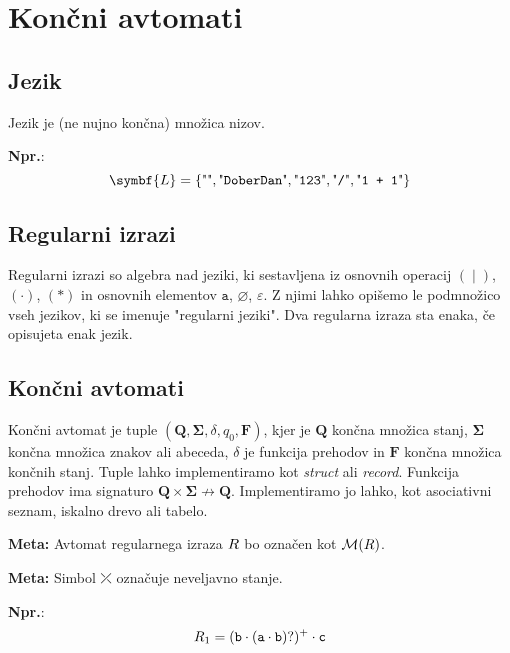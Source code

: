 \documentclass{report}
\newcommand{\Ex}{\textbf{Npr.}:\ }
\newcommand{\Special}[1]{\textbf{#1}}
\newcommand{\Empty}{\varnothing}
\newcommand{\Null}{\varepsilon}
\newcommand{\Automaton}[1]{\mathcal{M}(#1)}
\newcommand{\Str}[1]{\text{\textquotedbl\texttt{#1}\textquotedbl}}
\newcommand{\Char}[1]{\texttt{#1}}
\newcommand{\Seq}{\cdot}
\newcommand{\Union}{\mathrel{|}}
\newcommand{\KleenePlus}[1]{#1^+}
\newcommand{\Err}{\rdiagovfdiag}
\newcommand{\Set}[1]{\symbf{#1}}
\newcommand{\Alphabet}{\Set{\Sigma}}
\newlength{\arrow}
\newcommand{\RE}[1]{{\uppercase{#1}}}
\begin{document}
\chapter{Končni avtomati}

\section{Jezik}
Jezik je (ne nujno končna) množica nizov.

\Ex
\begin{equation*}
  \Set{L} = \{\Str{}, \Str{DoberDan}, \Str{123}, \Str{/}, \Str{1 + 1} \}
\end{equation*}

\section{Regularni izrazi}
Regularni izrazi so algebra nad jeziki, ki sestavljena iz osnovnih operacij $(\Union)$, $(\Seq)$, $(\ast)$ in osnovnih elementov $\Char{a}$, $\Empty$, $\Null$.
Z njimi lahko opišemo le podmnožico vseh jezikov, ki se imenuje "regularni jeziki".
Dva regularna izraza sta enaka, če opisujeta enak jezik.



\section{Končni avtomati}

Končni avtomat je tuple $(\Set{Q}, \Alphabet, \delta, q_0, \Set{F})$, kjer je $\Set{Q}$ končna množica stanj, $\Alphabet$ končna množica znakov ali abeceda, $\delta$ je funkcija prehodov in $\Set{F}$ končna množica končnih stanj.
Tuple lahko implementiramo kot \emph{struct} ali \emph{record}.
Funkcija prehodov ima signaturo $\Set{Q} \times \Alphabet \not\rightarrow \Set{Q}$.
Implementiramo jo lahko, kot asociativni seznam, iskalno drevo ali tabelo.

\Special{Meta:} Avtomat regularnega izraza $\RE{r}$ bo označen kot $\Automaton{\RE{r}}$.

\Special{Meta:} Simbol $\Err$ označuje neveljavno stanje.

\Ex
\begin{equation*}
  \RE{r}_1 = \KleenePlus{(\Char{b} \Seq (\Char{a} \Seq \Char{b})?)} \Seq \Char{c} \\
\end{equation*}
\begin{center}
\end{center}
\end{document}
